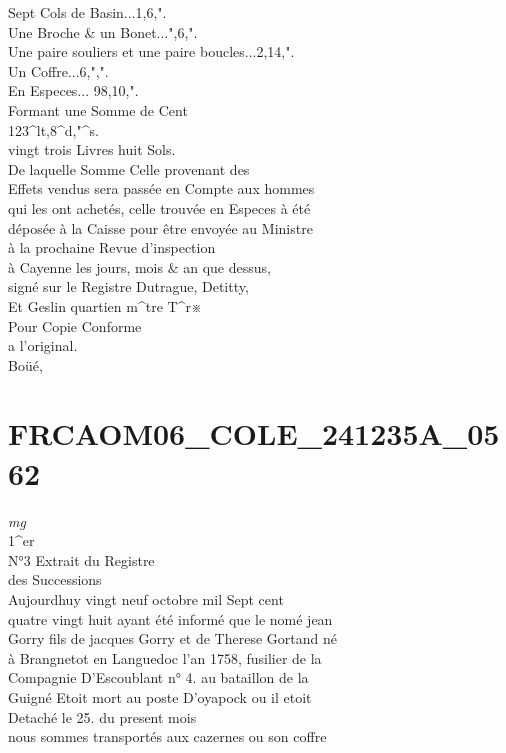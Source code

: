 \documentclass{article}
\begin{document}
\begin{pages}
Sept Cols de Basin...1,6,".\\
Une Broche \& un Bonet...",6,".\\
Une paire souliers et une paire boucles...2,14,".\\
Un Coffre...6,",".\\
En Especes... 98,10,".\\
Formant une Somme de Cent\\
123\^{}lt,8\^{}d,"\^{}s.\\
vingt trois Livres huit Sols.\\
De laquelle Somme Celle provenant des\\
Effets vendus sera passée en Compte aux hommes\\
qui les ont achetés, celle trouvée en Especes à été\\
déposée à la Caisse pour être envoyée au Ministre\\
à la prochaine Revue d'inspection\\
à Cayenne les jours, mois \& an que dessus,\\
signé sur le Registre Dutrague, Detitty,\\
Et Geslin quartien m\^{}tre T\^{}r※\\
Pour Copie Conforme\\
a l'original.\\
Boüé,
\pend
\endnumbering\beginnumbering\section{FRCAOM06\_COLE\_241235A\_0562}
\vspace{0.5cm}\noindent
\textit{mg}
\footnotesize \\
1\^{}er\\
N°3
\normalsize \pstart
Extrait du Registre\\
des Successions\\
Aujourdhuy vingt neuf octobre mil Sept cent\\
quatre vingt huit ayant été informé que le nomé jean\\
Gorry fils de jacques Gorry et de Therese Gortand né\\
à Brangnetot en Languedoc l'an 1758, fusilier de la\\
Compagnie D'Escoublant n° 4. au bataillon de la\\
Guigné Etoit mort au poste D'oyapock ou il etoit\\
Detaché le 25. du present mois\\
nous sommes transportés aux cazernes ou son coffre\\

\end{pages}
\end{document}
